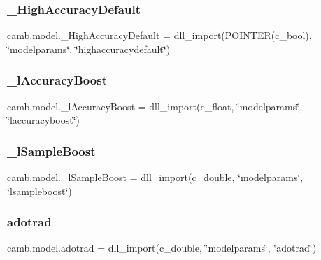 \subsubsection{\texorpdfstring{\+\_\+\+High\+Accuracy\+Default}{\_HighAccuracyDefault}}
{\footnotesize\ttfamily camb.\+model.\+\_\+\+High\+Accuracy\+Default = dll\+\_\+import(P\+O\+I\+N\+T\+ER(c\+\_\+bool), \char`\"{}modelparams\char`\"{}, \char`\"{}highaccuracydefault\char`\"{})\hspace{0.3cm}{\ttfamily [private]}}

\mbox{\label{namespacecamb_1_1model_a62011da9b7a3ed29a9c29d0568fa7794}} 
\subsubsection{\texorpdfstring{\+\_\+l\+Accuracy\+Boost}{\_lAccuracyBoost}}
{\footnotesize\ttfamily camb.\+model.\+\_\+l\+Accuracy\+Boost = dll\+\_\+import(c\+\_\+float, \char`\"{}modelparams\char`\"{}, \char`\"{}laccuracyboost\char`\"{})\hspace{0.3cm}{\ttfamily [private]}}

\mbox{\label{namespacecamb_1_1model_a7d8e7de62dd1ffbbbf48bc7f8d991bdf}} 
\subsubsection{\texorpdfstring{\+\_\+l\+Sample\+Boost}{\_lSampleBoost}}
{\footnotesize\ttfamily camb.\+model.\+\_\+l\+Sample\+Boost = dll\+\_\+import(c\+\_\+double, \char`\"{}modelparams\char`\"{}, \char`\"{}lsampleboost\char`\"{})\hspace{0.3cm}{\ttfamily [private]}}

\mbox{\label{namespacecamb_1_1model_afd2b37e87bc43463aa6c8642feff62ae}} 
\subsubsection{\texorpdfstring{adotrad}{adotrad}}
{\footnotesize\ttfamily camb.\+model.\+adotrad = dll\+\_\+import(c\+\_\+double, \char`\"{}modelparams\char`\"{}, \char`\"{}adotrad\char`\"{})}

